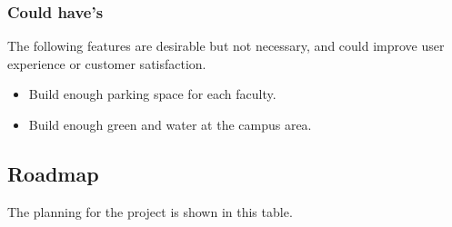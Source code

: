 \subsubsection{Could have's}
The following features are desirable but not necessary, and could improve user experience or customer satisfaction.
\begin{itemize}
	\item Build enough parking space for each faculty.
	\item Build enough green and water at the campus area.
\end{itemize}

\subsection{Roadmap}
The planning for the project is shown in this table.

